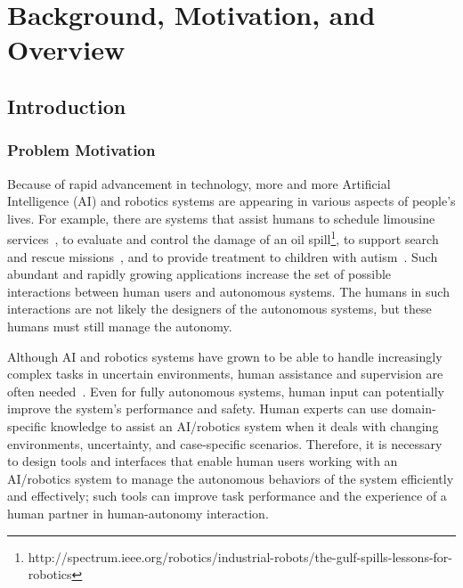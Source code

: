\chapter{Background, Motivation, and Overview}
\label{chap:intro}

\section{Introduction}
\label{intro}

\subsection{Problem Motivation}
\label{motivation}

Because of rapid advancement in technology, more and more Artificial Intelligence (AI) and robotics systems are appearing in various aspects of people's lives. For example, there are systems that assist humans to schedule limousine services~\cite{Chun2010Limousine}, to evaluate and control the damage of an oil spill\footnote{http://spectrum.ieee.org/robotics/industrial-robots/the-gulf-spills-lessons-for-robotics}, to support search and rescue missions~\cite{Casper2003Human,Lin2010Supporting}, and to provide treatment to children with autism~\cite{Robins2009From}. Such abundant and rapidly growing applications increase the set of possible interactions between human users and autonomous systems. The humans in such interactions are not likely the designers of the autonomous systems, but these humans must still manage the autonomy.

Although AI and robotics systems have grown to be able to handle increasingly complex tasks in uncertain environments, human assistance and supervision are often needed~\cite{Bainbridge1983Ironies}. Even for fully autonomous systems, human input can potentially improve the system's performance and safety. Human experts can use domain-specific knowledge to assist an AI/robotics system when it deals with changing environments, uncertainty, and case-specific scenarios. Therefore, it is necessary to design tools and interfaces that enable human users working with an AI/robotics system to manage the autonomous behaviors of the system efficiently and effectively; such tools can improve task performance and the experience of a human partner in human-autonomy interaction. 

